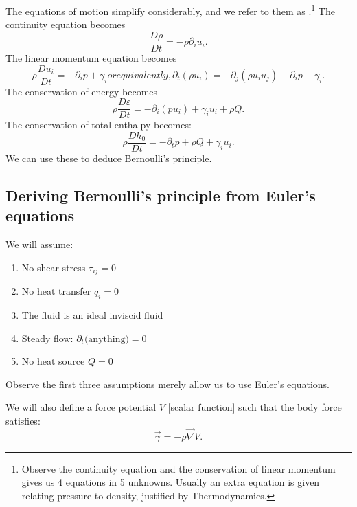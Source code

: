 \begin{node}
The equations of motion simplify considerably, and we refer to them as
.\footnote{Observe the continuity equation
and the conservation of linear momentum gives us 4 equations in 5
unknowns. Usually an extra equation is given relating pressure to
density, justified by Thermodynamics.} The continuity equation
becomes
\begin{equation}
\frac{D\rho}{Dt}=-\rho\partial_{i}u_{i}.
\end{equation}
The linear momentum equation becomes
\begin{subequations}
\begin{equation}
\rho\frac{D u_{i}}{D t}=-\partial_{i}p+\gamma_{i}
\end{equation}
or equivalently,
\begin{equation}
\partial_{t}(\rho u_{i})=-\partial_{j}(\rho u_{i}u_{j})-\partial_{i}p-\gamma_{i}.
\end{equation}
\end{subequations}
The conservation of energy becomes
\begin{equation}
\rho\frac{D\varepsilon}{D t}=-\partial_{i}(pu_{i})+\gamma_{i}u_{i}+\rho Q.
\end{equation}
The conservation of total enthalpy becomes:
\begin{equation}
\rho\frac{D h_{0}}{D t}=-\partial_{t}p+\rho Q+\gamma_{i}u_{i}.
\end{equation}
We can use these to deduce Bernoulli's principle.
\end{node}

\subsection*{Deriving Bernoulli's principle from Euler's equations}

\begin{assume}
We will assume:
\begin{enumerate}
\item No shear stress $\tau_{ij}=0$
\item No heat transfer $q_{i}=0$
\item The fluid is an ideal inviscid fluid
\item Steady flow: $\partial_{t}\mbox{(anything)}=0$
\item No heat source $Q=0$
\end{enumerate}
Observe the first three assumptions merely allow us to use Euler's
equations.

We will also define a force potential $V$ [scalar function] such that
the body force satisfies:
\begin{equation}
\vec{\gamma}=-\rho\vec{\nabla}V.
\end{equation}
\end{assume}

